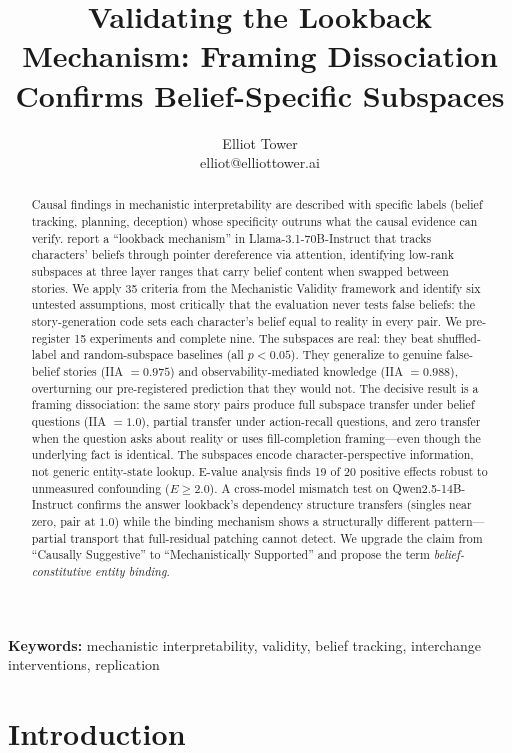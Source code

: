 \documentclass{article}
\title{Validating the Lookback Mechanism: Framing Dissociation Confirms Belief-Specific Subspaces}
\author{\name Elliot Tower \\
      \email elliot@elliottower.ai}
\begin{document}
\maketitle

\begin{abstract}
Causal findings in mechanistic interpretability are described with specific labels (belief tracking, planning, deception) whose specificity outruns what the causal evidence can verify. \citet{prakash2025lookback} report a ``lookback mechanism'' in Llama-3.1-70B-Instruct that tracks characters' beliefs through pointer dereference via attention, identifying low-rank subspaces at three layer ranges that carry belief content when swapped between stories. We apply 35 criteria from the Mechanistic Validity framework and identify six untested assumptions, most critically that the evaluation never tests false beliefs: the story-generation code sets each character's belief equal to reality in every pair. We pre-register 15 experiments and complete nine. The subspaces are real: they beat shuffled-label and random-subspace baselines (all $p < 0.05$). They generalize to genuine false-belief stories (IIA $= 0.975$) and observability-mediated knowledge (IIA $= 0.988$), overturning our pre-registered prediction that they would not. The decisive result is a framing dissociation: the same story pairs produce full subspace transfer under belief questions (IIA $= 1.0$), partial transfer under action-recall questions, and zero transfer when the question asks about reality or uses fill-completion framing---even though the underlying fact is identical. The subspaces encode character-perspective information, not generic entity-state lookup. E-value analysis finds 19 of 20 positive effects robust to unmeasured confounding ($E \geq 2.0$). A cross-model mismatch test on Qwen2.5-14B-Instruct confirms the answer lookback's dependency structure transfers (singles near zero, pair at $1.0$) while the binding mechanism shows a structurally different pattern---partial transport that full-residual patching cannot detect. We upgrade the claim from ``Causally Suggestive'' to ``Mechanistically Supported'' and propose the term \emph{belief-constitutive entity binding}.
\end{abstract}

\noindent\textbf{Keywords:} mechanistic interpretability, validity, belief tracking, interchange interventions, replication


\section{Introduction}
\label{sec:intro}
\end{document}
